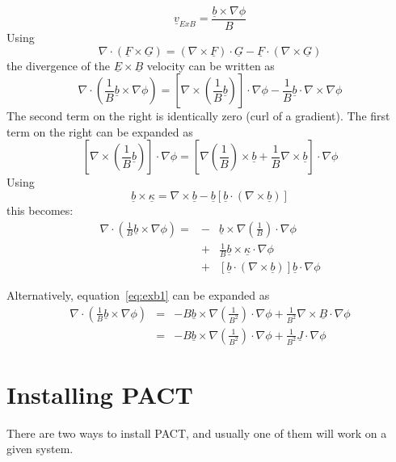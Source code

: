 \documentclass[12pt]{article}
\begin{document}
\[
\underline{v}_{ExB} = \frac{\underline{b}\times\nabla\phi}{B}
\]
Using
\[
\nabla\cdot\left(\underline{F}\times\underline{G}\right) = \left(\nabla\times\underline{F}\right)\cdot\underline{G} - \underline{F}\cdot\left(\nabla\times\underline{G}\right)
\]
the divergence of the $\underline{E}\times\underline{B}$ velocity
can be written as 
\begin{equation}
\nabla\cdot\left(\frac{1}{B}\underline{b}\times\nabla\phi\right) = \left[\nabla\times\left(\frac{1}{B}\underline{b}\right)\right]\cdot\nabla\phi - \frac{1}{B}\underline{b}\cdot\nabla\times\nabla\phi
\label{eq:exb1}
\end{equation}
The second term on the right is identically zero (curl of a gradient). The first term on the right can be expanded as
\[
\left[\nabla\times\left(\frac{1}{B}\underline{b}\right)\right]\cdot\nabla\phi = \left[\nabla\left(\frac{1}{B}\right)\times\underline{b} + \frac{1}{B}\nabla\times\underline{b}\right]\cdot\nabla\phi
\]
Using
\[
\underline{b}\times\underline{\kappa} = \nabla\times\underline{b} - \underline{b}\left[\underline{b}\cdot\left(\nabla\times\underline{b}\right)\right]
\]
this becomes:
\begin{eqnarray*}
  \nabla\cdot\left(\frac{1}{B}\underline{b}\times\nabla\phi\right) = &-&\underline{b}\times\nabla\left(\frac{1}{B}\right)\cdot\nabla\phi \\
  &+& \frac{1}{B}\underline{b}\times\underline{\kappa}\cdot\nabla\phi \\
  &+& \left[\underline{b}\cdot\left(\nabla\times\underline{b}\right)\right]\underline{b}\cdot\nabla\phi
\end{eqnarray*}

Alternatively, equation~\ref{eq:exb1} can be expanded as
\begin{eqnarray*}
  \nabla\cdot\left(\frac{1}{B}\underline{b}\times\nabla\phi\right) &=& -B\underline{b}\times\nabla\left(\frac{1}{B^2}\right)\cdot\nabla\phi + \frac{1}{B^2}\nabla\times\underline{B}\cdot\nabla\phi \\
  &=& -B\underline{b}\times\nabla\left(\frac{1}{B^2}\right)\cdot\nabla\phi + \frac{1}{B^2}\underline{J}\cdot\nabla\phi
\end{eqnarray*}

\section{Installing PACT}
\label{apx:pact}
There are two ways to install PACT, and usually one of them will 
work on a given system. 
\end{document}
